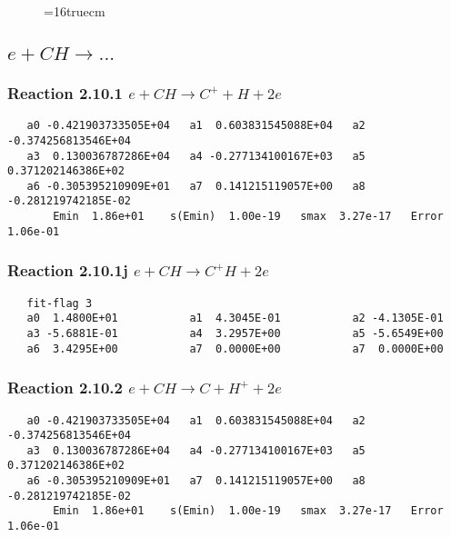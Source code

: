 \documentclass[12pt]{article}
\begin{document}
\begin{figure} \label{met.1_2.8}
\epsfxsize=16truecm
\end{figure}
\newpage

\subsection{     
$e + CH \rightarrow ... $ 
}
\subsubsection{
Reaction 2.10.1   $e + CH \rightarrow C^+ + H + 2e$
}

\begin{small}\begin{verbatim} 
   a0 -0.421903733505E+04   a1  0.603831545088E+04   a2 -0.374256813546E+04
   a3  0.130036787286E+04   a4 -0.277134100167E+03   a5  0.371202146386E+02
   a6 -0.305395210909E+01   a7  0.141215119057E+00   a8 -0.281219742185E-02
       Emin  1.86e+01    s(Emin)  1.00e-19   smax  3.27e-17   Error  1.06e-01
\end{verbatim}\end{small}

\subsubsection{
Reaction 2.10.1j  $e + CH \rightarrow C^{+} H + 2e$
}

\begin{small}\begin{verbatim} 
   fit-flag 3
   a0  1.4800E+01           a1  4.3045E-01           a2 -4.1305E-01 
   a3 -5.6881E-01           a4  3.2957E+00           a5 -5.6549E+00 
   a6  3.4295E+00           a7  0.0000E+00           a7  0.0000E+00
\end{verbatim}\end{small}

\subsubsection{
Reaction 2.10.2   $e + CH \rightarrow C + H^+ + 2e$
}

\begin{small}\begin{verbatim}
   a0 -0.421903733505E+04   a1  0.603831545088E+04   a2 -0.374256813546E+04
   a3  0.130036787286E+04   a4 -0.277134100167E+03   a5  0.371202146386E+02
   a6 -0.305395210909E+01   a7  0.141215119057E+00   a8 -0.281219742185E-02
       Emin  1.86e+01    s(Emin)  1.00e-19   smax  3.27e-17   Error  1.06e-01
\end{verbatim}\end{small}
\end{document}
